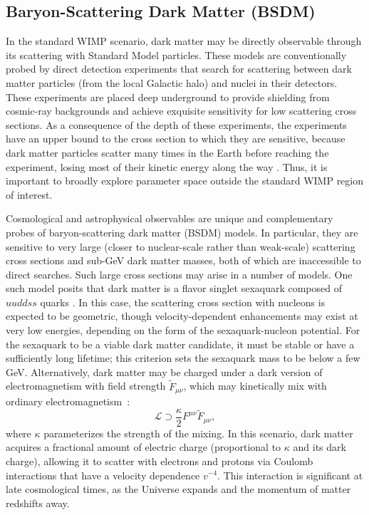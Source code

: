      
\subsection{Baryon-Scattering Dark Matter (BSDM) }
\label{sec:bsdm}

In the standard WIMP scenario, dark matter may be directly observable through its scattering with Standard Model particles.
These models are conventionally probed by direct detection experiments that search for scattering between dark matter particles (from the local Galactic halo) and nuclei in their detectors.
These experiments are placed deep underground to provide shielding from cosmic-ray backgrounds and achieve exquisite sensitivity for low scattering cross sections. As a consequence of the depth of these experiments, the experiments have an upper bound to the cross section to which they are sensitive, because dark matter particles scatter many times in the Earth before reaching the experiment, losing most of their kinetic energy along the way \citep{Zaharijas:2004jv}.
Thus, it is important to broadly explore parameter space outside the standard WIMP region of interest.

Cosmological and astrophysical observables are unique and complementary probes of baryon-scattering dark matter (BSDM) models.
In particular, they are sensitive to very large (closer to nuclear-scale rather than weak-scale) scattering cross sections and sub-GeV dark matter masses, both of which are inaccessible to direct searches.
Such large cross sections may arise in a number of models.
One such model posits that dark matter is a flavor singlet sexaquark composed of $uuddss$ quarks \citep{Farrar:2017eqq}.
In this case, the scattering cross section with nucleons is expected to be geometric, though velocity-dependent enhancements may exist at very low energies, depending on the form of the sexaquark-nucleon potential.
For the sexaquark to be a viable dark matter candidate, it must be stable or have a sufficiently long lifetime; this criterion sets the sexaquark mass to be below a few GeV.
Alternatively, dark matter may be charged under a dark version of electromagnetism with field strength $\tilde{F}_{\mu\nu}$, which may kinetically mix with ordinary electromagnetism~\citep{Holdom:1985ag}:
\begin{equation}
    \mathcal{L} \supset \frac{\kappa}{2} F^{\mu\nu} \tilde{F}_{\mu\nu} ,
\end{equation}
where $\kappa$ parameterizes the strength of the mixing.
In this scenario, dark matter acquires a fractional amount of electric charge (proportional to $\kappa$ and its dark charge), allowing it to scatter with electrons and protons via Coulomb interactions that have a velocity dependence $v^{-4}$.
This interaction is significant at late cosmological times, as the Universe expands and the momentum of matter redshifts away.

